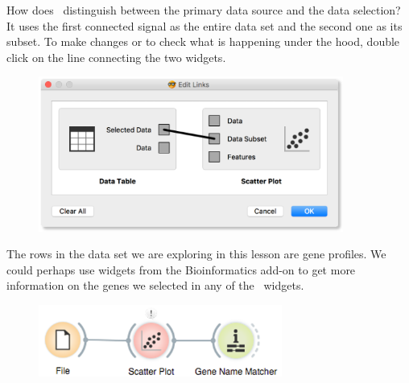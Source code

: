 How does \mutation\  distinguish between the primary data source and the data selection? It uses the first connected signal as the entire data set and the second one as its subset. To make changes or to check what is happening under the hood, double click on the line connecting the two widgets.
\newpage


\begin{figure}[h]
  \flushright
  \includegraphics[width=100mm]{graphics/ch-workflows/workflow-fig6.png}
\label{fig:workflow-fig6}%
\end{figure}

The rows in the data set we are exploring in this lesson are gene profiles. We could perhaps use widgets from the Bioinformatics add-on to get more information on the genes we selected in any of the \mutation\ widgets.

\begin{figure}[h]
  \flushright
  \includegraphics[width=80mm]{graphics/ch-workflows/workflow-fig7.png}%
\label{fig:workflow-fig7}%
\end{figure}

